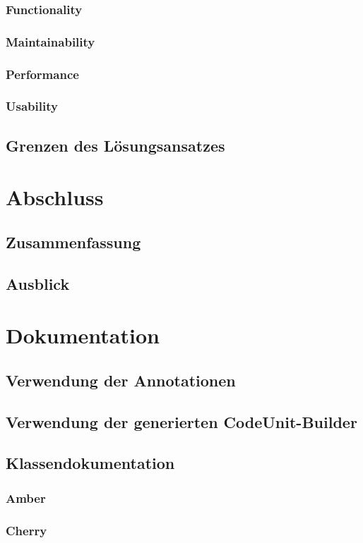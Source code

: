 \documentclass[12pt,oneside,a4paper,parskip]{scrbook}
\begin{document}
\subsection{Functionality}
\subsection{Maintainability}
\subsection{Performance}
\subsection{Usability}
\section{Grenzen des Lösungsansatzes}

\chapter{Abschluss}
\section{Zusammenfassung}
\section{Ausblick}

\appendix
\chapter{Dokumentation}
\section{Verwendung der Annotationen}
\section{Verwendung der generierten CodeUnit-Builder}
\section{Klassendokumentation}
\subsection{Amber}
\subsection{Cherry}
\end{document}
